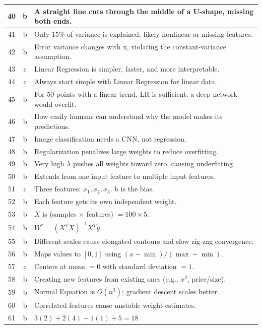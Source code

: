 \documentclass[12pt, a4paper]{article}
\begin{document}
\begin{longtable}{|c|c|p{9.5cm}|}
\hline
40 & b & A straight line cuts through the middle of a U-shape, missing both ends. \\
\hline
41 & b & Only 15\% of variance is explained; likely nonlinear or missing features. \\
\hline
42 & b & Error variance changes with x, violating the constant-variance assumption. \\
\hline
43 & c & Linear Regression is simpler, faster, and more interpretable. \\
\hline
44 & c & Always start simple with Linear Regression for linear data. \\
\hline
45 & b & For 50 points with a linear trend, LR is sufficient; a deep network would overfit. \\
\hline
46 & b & How easily humans can understand why the model makes its predictions. \\
\hline
47 & b & Image classification needs a CNN, not regression. \\
\hline
48 & b & Regularization penalizes large weights to reduce overfitting. \\
\hline
49 & b & Very high $\lambda$ pushes all weights toward zero, causing underfitting. \\
\hline
50 & b & Extends from one input feature to multiple input features. \\
\hline
51 & c & Three features: $x_1, x_2, x_3$. b is the bias. \\
\hline
52 & b & Each feature gets its own independent weight. \\
\hline
53 & b & $X$ is (samples $\times$ features) $= 100 \times 5$. \\
\hline
54 & b & $W^* = (X^TX)^{-1}X^Ty$ \\
\hline
55 & b & Different scales cause elongated contours and slow zig-zag convergence. \\
\hline
56 & b & Maps values to $[0, 1]$ using $(x - \min)/(\max - \min)$. \\
\hline
57 & c & Centers at mean $= 0$ with standard deviation $= 1$. \\
\hline
58 & b & Creating new features from existing ones (e.g., $x^2$, price/size). \\
\hline
59 & b & Normal Equation is $O(n^3)$; gradient descent scales better. \\
\hline
60 & b & Correlated features cause unstable weight estimates. \\
\hline
61 & b & $3(2) + 2(4) - 1(1) + 5 = 18$ \\

\end{longtable}
\end{document}
